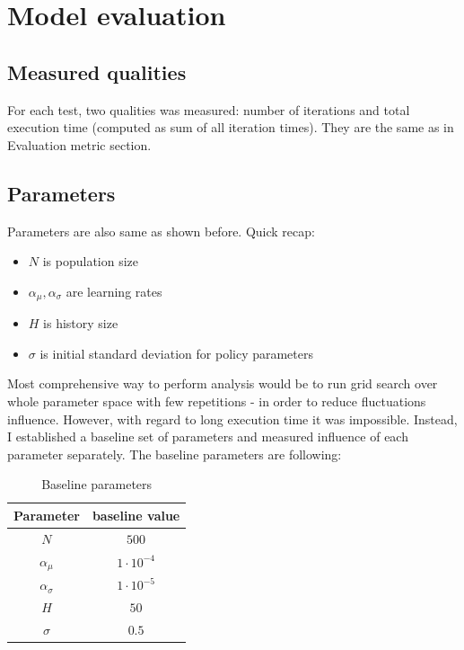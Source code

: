 \documentclass[12pt]{article}
\begin{document}
\section{Model evaluation}

\subsection{Measured qualities}

For each test, two qualities was measured: number of iterations and total execution time (computed as sum of all iteration times). They are the same as in Evaluation metric section.

\subsection{Parameters}

Parameters are also same as shown before. Quick recap:

\begin{itemize}
\item $N$ is population size
\item $\alpha_\mu, \alpha_\sigma$ are learning rates
\item $H$ is history size
\item $\sigma$ is initial standard deviation for policy parameters

\end{itemize}

Most comprehensive way to perform analysis would be to run grid search over whole parameter space with few repetitions - in order to reduce fluctuations influence. However, with regard to long execution time it was impossible. Instead, I established a baseline set of parameters and measured influence of each parameter separately. The baseline parameters are following:

\begin{table}[!h]
\centering
\begin{tabular}{|c|c|}
\hline 
Parameter & baseline value \\
\hline 
$N$ & $500$ \\
\hline 
$\alpha_\mu$ & $1 \cdot 10^{-4}$ \\
\hline 
$\alpha_\sigma$ & $1 \cdot 10^{-5}$ \\
\hline 
$H$ & $50$ \\
\hline 
$\sigma$ & $0.5$ \\
\hline 
\end{tabular} 
\caption{Baseline parameters}
\end{table}
\end{document}
